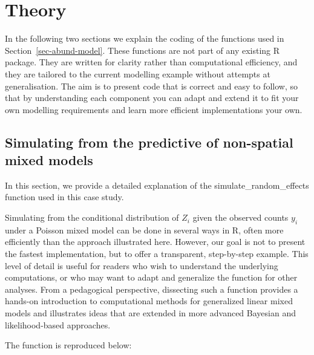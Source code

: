 \documentclass[
  letterpaper,
]{krantz}
\begin{document}
\section{Theory}\label{theory-1}

In the following two sections we explain the coding of the functions
used in Section~\ref{sec-abund-model}. These functions are not part of
any existing R package. They are written for clarity rather than
computational efficiency, and they are tailored to the current modelling
example without attempts at generalisation. The aim is to present code
that is correct and easy to follow, so that by understanding each
component you can adapt and extend it to fit your own modelling
requirements and learn more efficient implementations your own.

\subsection{Simulating from the predictive of non-spatial mixed
models}\label{sec-sim-re}

In this section, we provide a detailed explanation of the
simulate\_random\_effects function used in this case study.

Simulating from the conditional distribution of \(Z_i\)\hspace{0pt}
given the observed counts \(y_i\)\hspace{0pt} under a Poisson mixed
model can be done in several ways in R, often more efficiently than the
approach illustrated here. However, our goal is not to present the
fastest implementation, but to offer a transparent, step-by-step
example. This level of detail is useful for readers who wish to
understand the underlying computations, or who may want to adapt and
generalize the function for other analyses. From a pedagogical
perspective, dissecting such a function provides a hands-on introduction
to computational methods for generalized linear mixed models and
illustrates ideas that are extended in more advanced Bayesian and
likelihood-based approaches.

The function is reproduced below:
\end{document}
